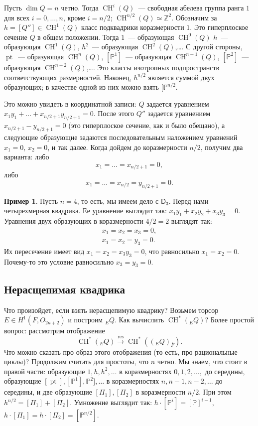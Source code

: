\documentclass[a4paper]{article}
\DeclareMathOperator{\CH}{CH}
\DeclareMathOperator{\pt}{pt}
\DeclareMathOperator{\res}{res}
\newcommand{\isom}{\simeq}
\theoremstyle{definition}
\newtheorem{example}[theorem]{Пример}
\newcommand{\ol}{\overline}
\begin{document}
Пусть $\dim Q = n$ четно.
Тогда $\CH^i(Q)$~--- свободная абелева группа ранга $1$
для всех $i=0,\dots,n$, кроме $i= n/2$; $\CH^{n/2}(Q)\isom\mathbb Z^2$.
Обозначим за $h = [Q'']\in\CH^1(Q)$ класс подквадрики коразмерности $1$.
Это гиперплоское сечение $Q$ в общем положении.
Тогда $1$~--- образующая $\CH^0(Q)$
$h$~--- образующая $\CH^1(Q)$,
$h^2$~--- образующая $\CH^2(Q)$,\dots.
С другой стороны, $\pt$~--- образующая $\CH^n(Q)$,
$[\mathbb{P}^1]$~--- образующая $\CH^{n-1}(Q)$,
$[\mathbb{P}^2]$~--- образующая $\CH^{n-2}(Q)$,\dots.
Это классы изотропных подпространств соответствующих размерностей.
Наконец, $h^{n/2}$ является суммой двух образующих; в качестве
одной из них можно взять $[\mathbb{P}^{n/2}$.

Это можно увидеть в координатной записи:
$Q$ задается уравнением $x_1 y_1 + \dots + x_{n/2+1}y_{n/2+1} = 0$.
После этого $Q''$ задается уравнением $x_{n/2+1} - y_{n/2+1} = 0$
(это гиперплоское сечение, как и было обещано),
а следующие образующие задаются последовательным
наложением уравнений $x_{1} = 0$,
$x_{2} = 0$, и так далее.
Когда дойдем до коразмерности $n/2$,
получим два варианта: либо
\[ x_1 = \dots = x_{n/2+1} = 0, \]
либо
\[ x_1 = \dots = x_{n/2} = y_{n/2+1} = 0. \]

\begin{example}
Пусть $n=4$, то есть, мы имеем дело с $\mathsf{D}_3$.
Перед нами четырехмерная квадрика.
Ее уравнение выглядит так: $x_1y_1 + x_2y_2 + x_3y_3 = 0$.
Уравнения двух образующих в коразмерности $4/2=2$ выглядят так:
\begin{gather*}
x_1 = x_2 = x_3 = 0,\\
x_1 = x_2 = y_3 = 0.
\end{gather*}
Их пересечение имеет вид $x_1 = x_2 = x_3y_3 = 0$,
что равносильно $x_1 = x_2 = 0$.
Почему-то это условие равносильно $x_3 = y_3 = 0$.
\end{example}


\subsection{Нерасщепимая квадрика}

Что произойдет, если взять нерасщепимую квадрику?
Возьмем торсор $E\in H^1(F, O_{2n+2})$ и построим ${}_{E}Q$.
Как вычислить $\CH^*({}_{E}Q)$?
Более простой вопрос:
рассмотрим отображение
\[
\CH^*({}_{E}Q) \xrightarrow{\res} \CH^*(({}_{E}Q)_{\ol{F}}).
\]
Что можно сказать про образ этого отображения (то есть,
про рациональные циклы)?
Продолжим считать для простоты, что $n$ четно.
Мы знаем, что стоит в правой части: образующие
$1,h,h^2,\dots$ в коразмерностях $0,1,2,\dots,$ до середины,
образующие $[\pt],[\mathbb{P}^1],\mathbb{P}^2],\dots$
в коразмерностях $n,n-1,n-2,\dots$ до середины,
и две образующие $[\Pi_1],[\Pi_2]$ в коразмерности $n/2$.
При этом $h^{n/2} = [\Pi_1] + [\Pi_2]$.
Умножение выглядит так:
$h\cdot[\mathbb{P}^i] = [\mathbb{P}]^{i-1}$,
$h\cdot[\Pi_1] = h\cdot [\Pi_2] = [\mathbb{P}^{n/2}]$.
\end{document}
